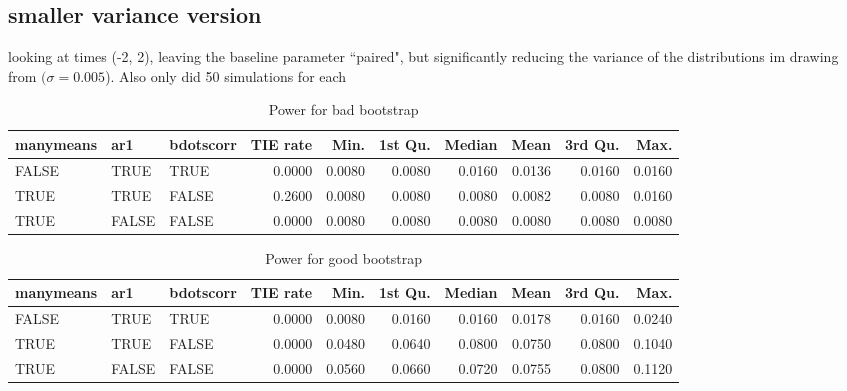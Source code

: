 \documentclass{article}
\begin{document}
\subsection{smaller variance version}

looking at times (-2, 2), leaving the baseline parameter ``paired", but significantly reducing the variance of the distributions im drawing from $(\sigma = 0.005$). Also only did 50 simulations for each

\begin{table}[ht]
\centering
\begin{tabular}{lllrrrrrrr}
  \hline
manymeans & ar1 & bdotscorr & TIE rate & Min. & 1st Qu. & Median & Mean & 3rd Qu. & Max. \\ 
  \hline
FALSE & TRUE & TRUE & 0.0000 & 0.0080 & 0.0080 & 0.0160 & 0.0136 & 0.0160 & 0.0160 \\ 
  TRUE & TRUE & FALSE & 0.2600 & 0.0080 & 0.0080 & 0.0080 & 0.0082 & 0.0080 & 0.0160 \\ 
  TRUE & FALSE & FALSE & 0.0000 & 0.0080 & 0.0080 & 0.0080 & 0.0080 & 0.0080 & 0.0080 \\ 
   \hline
\end{tabular}
\caption{Power for bad bootstrap} 
\label{tab:bad_boot_pwr2}
\end{table}

\begin{table}[ht]
\centering
\begin{tabular}{lllrrrrrrr}
  \hline
manymeans & ar1 & bdotscorr & TIE rate & Min. & 1st Qu. & Median & Mean & 3rd Qu. & Max. \\ 
  \hline
FALSE & TRUE & TRUE & 0.0000 & 0.0080 & 0.0160 & 0.0160 & 0.0178 & 0.0160 & 0.0240 \\ 
  TRUE & TRUE & FALSE & 0.0000 & 0.0480 & 0.0640 & 0.0800 & 0.0750 & 0.0800 & 0.1040 \\ 
  TRUE & FALSE & FALSE & 0.0000 & 0.0560 & 0.0660 & 0.0720 & 0.0755 & 0.0800 & 0.1120 \\ 
   \hline
\end{tabular}
\caption{Power for good bootstrap} 
\label{tab:good_boot_pwr2}
\end{table}
\end{document}
